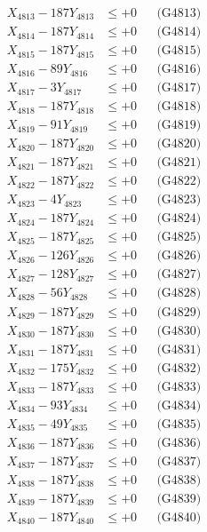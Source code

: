 \documentclass[a4paper,10pt]{article}
\begin{document}
{\begin{align}
X_{4813} - 187Y_{4813} &\leq +0 && \text{(G4813)} \\
X_{4814} - 187Y_{4814} &\leq +0 && \text{(G4814)} \\
X_{4815} - 187Y_{4815} &\leq +0 && \text{(G4815)} \\
X_{4816} - 89Y_{4816} &\leq +0 && \text{(G4816)} \\
X_{4817} - 3Y_{4817} &\leq +0 && \text{(G4817)} \\
X_{4818} - 187Y_{4818} &\leq +0 && \text{(G4818)} \\
X_{4819} - 91Y_{4819} &\leq +0 && \text{(G4819)} \\
X_{4820} - 187Y_{4820} &\leq +0 && \text{(G4820)} \\
\allowbreak
X_{4821} - 187Y_{4821} &\leq +0 && \text{(G4821)} \\
X_{4822} - 187Y_{4822} &\leq +0 && \text{(G4822)} \\
X_{4823} - 4Y_{4823} &\leq +0 && \text{(G4823)} \\
X_{4824} - 187Y_{4824} &\leq +0 && \text{(G4824)} \\
X_{4825} - 187Y_{4825} &\leq +0 && \text{(G4825)} \\
X_{4826} - 126Y_{4826} &\leq +0 && \text{(G4826)} \\
X_{4827} - 128Y_{4827} &\leq +0 && \text{(G4827)} \\
X_{4828} - 56Y_{4828} &\leq +0 && \text{(G4828)} \\
X_{4829} - 187Y_{4829} &\leq +0 && \text{(G4829)} \\
X_{4830} - 187Y_{4830} &\leq +0 && \text{(G4830)} \\
\allowbreak
X_{4831} - 187Y_{4831} &\leq +0 && \text{(G4831)} \\
X_{4832} - 175Y_{4832} &\leq +0 && \text{(G4832)} \\
X_{4833} - 187Y_{4833} &\leq +0 && \text{(G4833)} \\
X_{4834} - 93Y_{4834} &\leq +0 && \text{(G4834)} \\
X_{4835} - 49Y_{4835} &\leq +0 && \text{(G4835)} \\
X_{4836} - 187Y_{4836} &\leq +0 && \text{(G4836)} \\
X_{4837} - 187Y_{4837} &\leq +0 && \text{(G4837)} \\
X_{4838} - 187Y_{4838} &\leq +0 && \text{(G4838)} \\
X_{4839} - 187Y_{4839} &\leq +0 && \text{(G4839)} \\
X_{4840} - 187Y_{4840} &\leq +0 && \text{(G4840)} \\

\end{align}}
\end{document}
